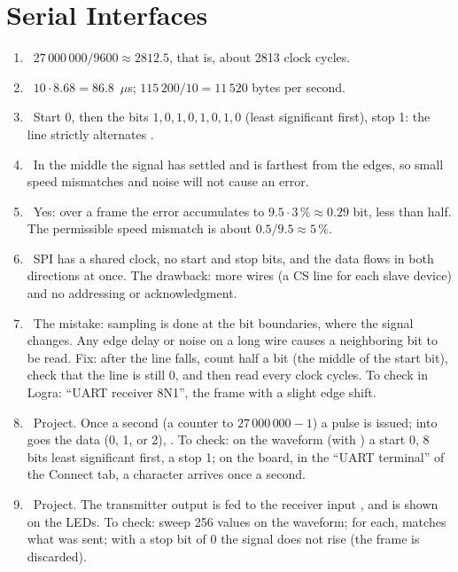 \section*{Serial Interfaces}
\begin{enumerate}
  \item {}~$27\,000\,000/9600 \approx 2812.5$, that is, about 2813 clock cycles.
  \item {}~$10\cdot 8.68 = 86.8$~$\mu$s; $115\,200/10 = 11\,520$ bytes per second.
  \item {}~Start 0, then the bits $1,0,1,0,1,0,1,0$ (least significant first), stop 1: the line strictly alternates .
  \item {}~In the middle the signal has settled and is farthest from the edges, so small speed mismatches and noise will not cause an error.
  \item {}~Yes: over a frame the error accumulates to $9.5\cdot 3\,\% \approx 0.29$ bit, less than half. The permissible speed mismatch is about $0.5/9.5\approx 5\,\%$.
  \item {}~SPI has a shared clock, no start and stop bits, and the data flows in both directions at once. The drawback: more wires (a CS line for each slave device) and no addressing or acknowledgment.
  \item {}~The mistake: sampling is done at the bit boundaries, where the signal changes. Any edge delay or noise on a long wire causes a neighboring bit to be read. Fix: after the line falls, count half a bit (the middle of the start bit), check that the line is still 0, and then read every  clock cycles. To check in Logra: ``UART receiver 8N1'', the frame  with a slight edge shift.
  \item {}~Project. Once a second (a counter to $27\,000\,000-1$) a  pulse is issued; into  goes the data  (0, 1, or 2), . To check: on the waveform (with ) a start 0, 8 bits least significant first, a stop 1; on the board, in the ``UART terminal'' of the Connect tab, a character arrives once a second.
  \item {}~Project. The transmitter output  is fed to the receiver input , and  is shown on the LEDs. To check: sweep 256 values on the waveform; for each,  matches what was sent; with a stop bit of 0 the signal  does not rise (the frame is discarded).
\end{enumerate}

